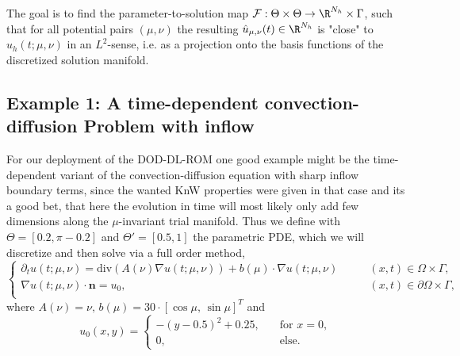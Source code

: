 The goal is to find the parameter-to-solution map $\mathcal{F}: \Theta \times \Theta \to \R^{N_h} \times \Gamma$, such that for all potential pairs $(\mu, \nu)$ the resulting $\hat{u}_{\mu, \nu}(t) \in \R^{N_h}$ is "close" to $u_h(t; \mu, \nu)$ in an $L^2$-sense, i.e. as a projection onto the basis functions of the discretized solution manifold.

\subsection{Example 1: A time-dependent convection-diffusion Problem with inflow}

For our deployment of the DOD-DL-ROM one good example might be the time-dependent variant of the convection-diffusion equation with sharp inflow boundary terms, since the wanted KnW properties were given in that case and its a good bet, that here the evolution in time will most likely only add few dimensions along the $\mu$-invariant trial manifold. Thus we define with $\Theta = [0.2, \pi - 0.2]$ and $\Theta' = [0.5, 1]$ the parametric PDE, which we will discretize and then solve via a full order method,
\begin{equation*} \begin{cases}
    \partial_t u(t; \mu, \nu) = \mbox{div} \left( A(\nu) \nabla u(t; \mu, \nu) \right) + b(\mu) \cdot \nabla u(t; \mu, \nu) \qquad &(x, t) \in \Omega \times \Gamma, \\
    \nabla u(t; \mu, \nu) \cdot \mathbf{n} = u_0, \qquad &(x, t) \in \partial \Omega \times \Gamma, \\
    \end{cases}
\end{equation*}
where $A(\nu) = \nu, \, b(\mu) = 30 \cdot [ \cos \mu, \, \sin \mu ]^T$ and
\begin{equation*}
    u_0(x, y) = \begin{cases} -(y - 0.5)^2 + 0.25, \quad &\text{for } x = 0, \\
    0, \quad &\text{else.} \end{cases}
\end{equation*}

